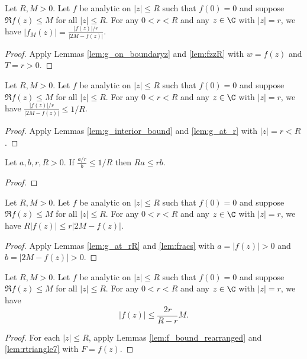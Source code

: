 \begin{lemma}[g at r]\label{lem:g_at_r}  \leanok
Let $R,M>0$. Let $f$ be analytic on $|z| \le R$ such that $f(0)=0$ and suppose $\Re f(z) \le M$ for all $|z| \le R$. For any $0<r<R$ and any $z\in\C$ with $|z|=r$, we have $|f_M(z)| = \frac{|f(z)|/r}{|2M - f(z)|}$.
\end{lemma}
\begin{proof} \leanok
{}
Apply Lemmas \ref{lem:g_on_boundaryz} and \ref{lem:fzzR} with $w=f(z)$ and $T=r>0$.
\end{proof}

\begin{lemma}[g bound r]\label{lem:g_at_rR}  \leanok
Let $R,M>0$. Let $f$ be analytic on $|z| \le R$ such that $f(0)=0$ and suppose $\Re f(z) \le M$ for all $|z| \le R$. For any $0<r<R$ and any $z\in\C$ with $|z|=r$, we have $\frac{|f(z)|/r}{|2M - f(z)|} \le 1/R$.
\end{lemma}
\begin{proof} \leanok
{}
Apply Lemmas \ref{lem:g_interior_bound} and \ref{lem:g_at_r} with $|z|=r<R$.
\end{proof}

\begin{lemma}\label{lem:fracs}  \leanok
Let $a,b,r,R>0$. If $\frac{a/r}{b} \le 1/R$ then $Ra \le rb$.
\end{lemma}
\begin{proof} \leanok
\end{proof}

\begin{lemma}\label{lem:f_bound_rearranged}  \leanok
Let $R,M>0$. Let $f$ be analytic on $|z| \le R$ such that $f(0)=0$ and suppose $\Re f(z) \le M$ for all $|z| \le R$. For any $0<r < R$ and any $z\in\C$ with $|z|=r$, we have $R|f(z)| \le r|2M - f(z)|$.
\end{lemma}
\begin{proof} \leanok
{}
Apply Lemmas \ref{lem:g_at_rR} and \ref{lem:fracs} with $a=|f(z)|>0$ and $b=|2M - f(z)|>0$.
\end{proof}


\begin{lemma}\label{lem:final_bound_on_circle0}  \leanok
Let $R,M>0$. Let $f$ be analytic on $|z| \le R$ such that $f(0)=0$ and suppose $\Re f(z) \le M$ for all $|z| \le R$. For any $0<r < R$ and any $z\in\C$ with $|z|=r$, we have
\[ |f(z)| \le \frac{2r}{R-r}M. \]
\end{lemma}
\begin{proof} \leanok
{}
For each $|z| \le R$, apply Lemmas \ref{lem:f_bound_rearranged} and \ref{lem:rtriangle7} with $F=f(z)$.
\end{proof}

